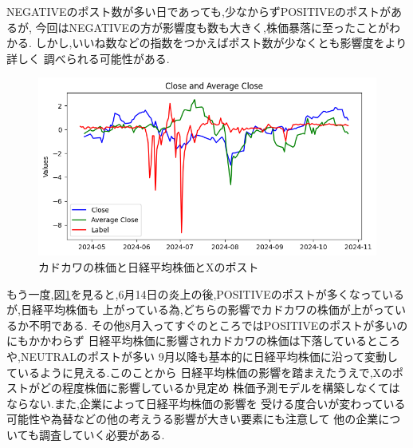 \documentclass[11pt]{jarticle}
\begin{document}
NEGATIVEのポスト数が多い日であっても,少なからずPOSITIVEのポストがあるが,
今回はNEGATIVEの方が影響度も数も大きく,株価暴落に至ったことがわかる.
しかし,いいね数などの指数をつかえばポスト数が少なくとも影響度をより詳しく
調べられる可能性がある.
\begin{figure}[h]
	\centering
	\includegraphics[scale=0.35]{image/kadokawa.png}
	
	\caption{カドカワの株価と日経平均株価とXのポスト}
	\label{fig:kadokawa}
\end{figure}
もう一度,図\ref{fig:kadokawa}を見ると,6月14日の炎上の後,POSITIVEのポストが多くなっているが,日経平均株価も
上がっている為,どちらの影響でカドカワの株価が上がっているか不明である.
その他8月入ってすぐのところではPOSITIVEのポストが多いのにもかかわらず
日経平均株価に影響されカドカワの株価は下落しているところや,NEUTRALのポストが多い
9月以降も基本的に日経平均株価に沿って変動しているように見える.このことから
日経平均株価の影響を踏まえたうえで,Xのポストがどの程度株価に影響しているか見定め
株価予測モデルを構築しなくてはならない.また,企業によって日経平均株価の影響を
受ける度合いが変わっている可能性や為替などの他の考えうる影響が大きい要素にも注意して
他の企業についても調査していく必要がある.
\end{document}
